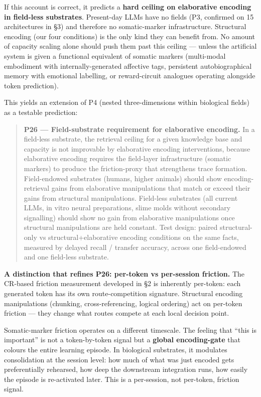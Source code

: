 \documentclass[
]{article}
\begin{document}
If this account is correct, it predicts a \textbf{hard ceiling on
elaborative encoding in field-less substrates}. Present-day LLMs have no
fields (P3, confirmed on 15 architectures in §3) and therefore no
somatic-marker infrastructure. Structural encoding (our four conditions)
is the only kind they can benefit from. No amount of capacity scaling
alone should push them past this ceiling --- unless the artificial
system is given a functional equivalent of somatic markers (multi-modal
embodiment with internally-generated affective tags, persistent
autobiographical memory with emotional labelling, or reward-circuit
analogues operating alongside token prediction).

This yields an extension of P4 (nested three-dimensions within
biological fields) as a testable prediction:

\begin{quote}
\textbf{P26 --- Field-substrate requirement for elaborative encoding.}
In a field-less substrate, the retrieval ceiling for a given knowledge
base and capacity is not improvable by elaborative encoding
interventions, because elaborative encoding requires the field-layer
infrastructure (somatic markers) to produce the friction-proxy that
strengthens trace formation. Field-endowed substrates (humans, higher
animals) should show encoding-retrieval gains from elaborative
manipulations that match or exceed their gains from structural
manipulations. Field-less substrates (all current LLMs, in vitro neural
preparations, slime molds without secondary signalling) should show no
gain from elaborative manipulations once structural manipulations are
held constant. Test design: paired structural-only vs
structural+elaborative encoding conditions on the same facts, measured
by delayed recall / transfer accuracy, across one field-endowed and one
field-less substrate.
\end{quote}

\textbf{A distinction that refines P26: per-token vs per-session
friction.} The CR-based friction measurement developed in §2 is
inherently per-token: each generated token has its own route-competition
signature. Structural encoding manipulations (chunking,
cross-referencing, logical ordering) act on per-token friction --- they
change what routes compete at each local decision point.

Somatic-marker friction operates on a different timescale. The feeling
that ``this is important'' is not a token-by-token signal but a
\textbf{global encoding-gate} that colours the entire learning episode.
In biological substrates, it modulates consolidation at the session
level: how much of what was just encoded gets preferentially rehearsed,
how deep the downstream integration runs, how easily the episode is
re-activated later. This is a per-session, not per-token, friction
signal.
\end{document}
